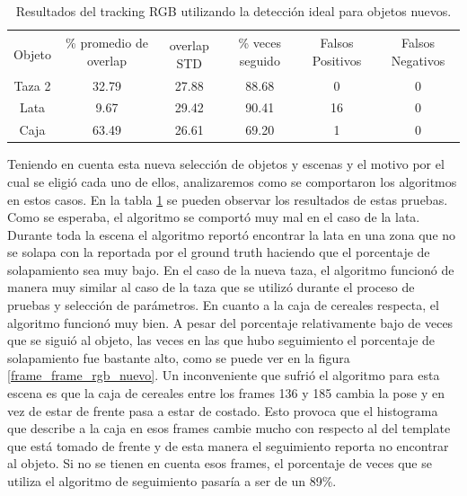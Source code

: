 \begin{table}
    \begin{tabular}{|c|c|c|c|c|c|}
    \hline
    & \multirow{2}{2.4cm}{\% promedio de overlap} & & \multirow{2}{2cm}{\% veces seguido} & \multirow{2}{1.6cm}{Falsos Positivos} & \multirow{2}{1.6cm}{Falsos Negativos}\\
	Objeto & & overlap STD & & &\\
    \hline
    Taza 2  & 32.79      & 27.88       & 88.68             & 0                & 0\\
    \hline
    Lata    &  9.67      & 29.42       & 90.41             & 16               & 0\\
    \hline
    Caja    & 63.49      & 26.61       & 69.20             & 1                & 0\\
    \hline
    \end{tabular}
\caption{Resultados del tracking RGB utilizando la detección ideal para objetos nuevos.}
\label{tabla_rgb_nuevos}
\end{table}


Teniendo en cuenta esta nueva selección de objetos y escenas y el motivo por el cual se eligió cada uno de ellos, analizaremos como se comportaron los algoritmos en estos casos. En la tabla \ref{tabla_rgb_nuevos} se pueden observar los resultados de estas pruebas. Como se esperaba, el algoritmo se comportó muy mal en el caso de la lata. Durante toda la escena el algoritmo reportó encontrar la lata en una zona que no se solapa con la reportada por el ground truth haciendo que el porcentaje de solapamiento sea muy bajo. En el caso de la nueva taza, el algoritmo funcionó de manera muy similar al caso de la taza que se utilizó durante el proceso de pruebas y selección de parámetros. En cuanto a la caja de cereales respecta, el algoritmo funcionó muy bien. A pesar del porcentaje relativamente bajo de veces que se siguió al objeto, las veces en las que hubo seguimiento el porcentaje de solapamiento fue bastante alto, como se puede ver en la figura \ref{frame_frame_rgb_nuevo}. Un inconveniente que sufrió el algoritmo para esta escena es que la caja de cereales entre los frames 136 y 185 cambia la pose y en vez de estar de frente pasa a estar de costado. Esto provoca que el histograma que describe a la caja en esos frames cambie mucho con respecto al del template que está tomado de frente y de esta manera el seguimiento reporta no encontrar al objeto. Si no se tienen en cuenta esos frames, el porcentaje de veces que se utiliza el algoritmo de seguimiento pasaría a ser de un 89\%.

